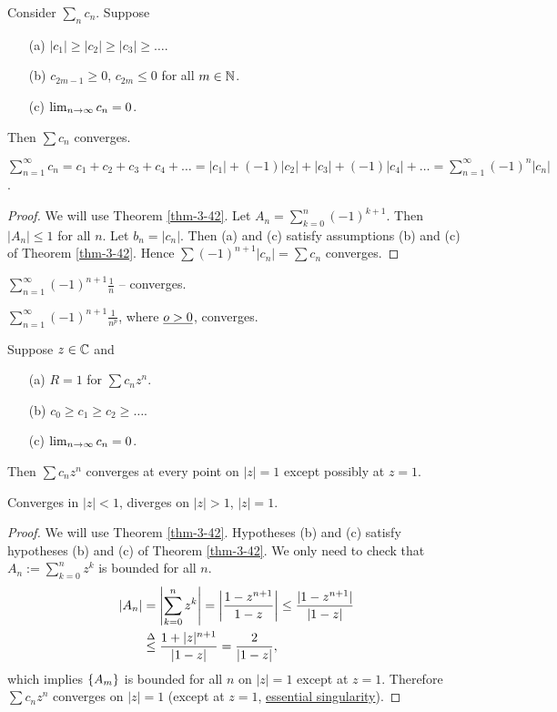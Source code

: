 \documentclass[]{article}
\begin{document}
\begin{theorem}
	Consider $\sum_n c_n$. Suppose
	\begin{enumerate}
		\item[(a)] $|c_1|\geq |c_2|\geq |c_3| \geq \dots$.
		\item[(b)] $c_{2m-1}\geq 0$, $c_{2m}\leq 0$ for all $m\in\mathbb{N}$.
		\item[(c)] $\lim_{n\rightarrow\infty} c_n = 0$.
	\end{enumerate}
	Then $\sum c_n$ converges.
	\label{thm-3-43}
\end{theorem}
\begin{note}
	$\sum_{n=1}^\infty c_n = c_1+c_2+c_3+c_4+\dots = |c_1|+(-1)|c_2|+|c_3|+(-1)|c_4| + \dots = \sum_{n=1}^\infty (-1)^n |c_n|$.
\end{note}
\begin{proof}
	We will use Theorem \ref{thm-3-42}.
	Let $A_n = \sum_{k=0}^n (-1)^{k+1}$. Then $|A_n|\leq 1$ for all $n$.
	Let $b_n = |c_n|$. Then (a) and (c) satisfy assumptions (b) and (c) of Theorem \ref{thm-3-42}.
	Hence $\sum(-1)^{n+1}|c_n| = \sum c_n$ converges.
\end{proof}
\begin{example}
	$\sum_{n=1}^\infty (-1)^{n+1}\frac{1}{n}$ -- converges.
\end{example}
\begin{example}
	$\sum_{n=1}^\infty (-1)^{n+1} \frac{1}{n^p}$, where $\underline{o>0}$, converges.
\end{example}

\begin{theorem}
	Suppose $z\in\mathbb{C}$ and
	\begin{enumerate}
		\item[(a)] $R=1$ for $\sum c_n z^n$.
		\item[(b)] $c_0\geq c_1\geq c_2\geq\dots$.
		\item[(c)] $\lim_{n\rightarrow\infty} c_n = 0$.
	\end{enumerate}
	Then $\sum c_n z^n$ converges at every point on $|z|=1$ except possibly at $z=1$.
\end{theorem}
\begin{remark}
	Converges in $|z|<1$, diverges on $|z|>1$, \ul{$|z|=1$}.
\end{remark}
\begin{proof}
	We will use Theorem \ref{thm-3-42}. Hypotheses (b) and (c) satisfy hypotheses (b) and (c) of Theorem \ref{thm-3-42}.
	We only need to check that $A_n:=\sum_{k=0}^n z^k$ is bounded for all $n$.
	\begin{align*}
		|A_n| &= \left| \sum_{k=0}^n z^k\right| = \left| \frac{1-z^{n+1}}{1-z}\right| \leq \frac{|1-z^{n+1}|}{|1-z|} \\
			  &\overset{\Delta}{\leq} \frac{1+|z|^{n+1}}{|1-z|} = \frac{2}{|1-z|},
	\end{align*}
	which implies $\left\{ A_m \right\}$ is bounded for all $n$ on $|z|=1$ except at $z=1$.
	Therefore $\sum c_n z^n$ converges on $|z|=1$ (except at $z=1$, \ul{essential singularity}).
\end{proof}
\end{document}
